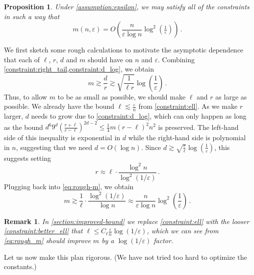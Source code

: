 \documentclass[10pt,a4paper]{article}
\newtheorem{proposition}{Proposition}[section]
\newtheorem{remark}{Remark}[section]
\renewcommand{\epsilon}{\varepsilon}
\begin{document}
\begin{proposition}
    \label{res:optimization}
    Under \cref{assumption:epsilon}, we may satisfy all of the
    constraints in such a way that
    \[
        m(n,\epsilon)
        = O\left( \frac{n}{\epsilon \log n} \log^2\left(\tfrac{1}{\epsilon}\right) \right) \,.
    \]
\end{proposition}

    We first sketch some rough calculations to motivate the asymptotic dependence that each of
    $\ell$, $r$, $d$ and $m$ should have on $n$ and $\epsilon$. Combining
    \cref{constraint:right_tail,constraint:d_log}, we obtain
    \begin{equation}
        \label{eq:rough-m}
        m \gtrsim \frac{d}{r} \gtrsim \sqrt{\frac{1}{\ell r}} \log\left(\frac{1}{\epsilon}\right)
        \,.
    \end{equation}
    Thus, to allow $m$ to be as small as possible, we should make $\ell$ and $r$ as large as
    possible. We already have the bound $\ell \lesssim \frac{\epsilon}{n}$ from
    \cref{constraint:ell}. As we make $r$ larger, $d$ needs to grow due to \cref{constraint:d_log},
    which can only happen as long as the bound
    $d^6 9^d \left(\frac{r+\ell}{r-\ell}\right)^{2d-2} \leq \tfrac{1}{4} m(r-\ell)^2 n^2$ is
    preserved. The left-hand side of this inequality is exponential in $d$ while
    the right-hand side is polynomial in $n$, suggesting that we need $d = O(\log n)$. Since $d
    \gtrsim \sqrt{\frac{r}{\ell}} \log\left(\frac{1}{\epsilon}\right)$, this suggests setting
    \[
        r \approx \ell \cdot \frac{\log^2 n}{\log^2(1/\epsilon)} \,.
    \]
    Plugging back into \eqref{eq:rough-m}, we obtain
    \begin{equation}
    \label{eq:rough_m}
        m \gtrsim \frac{1}{\ell} \cdot \frac{\log^2(1/\epsilon)}{\log n}
        \approx \frac{n}{\epsilon \log n} \log^2\left(\frac{1}{\epsilon}\right) \,.
    \end{equation}
    \begin{remark}
      In \cref{section:improved-bound} we replace \cref{constraint:ell} with the looser
      \cref{constraint:better_ell} that $\ell \leq C_\ell \tfrac{\epsilon}{n} \log(1/\epsilon)$, which we
      can see from \cref{eq:rough_m} should improve $m$ by a $\log(1/\epsilon)$ factor.
    \end{remark}
    Let us now make this plan rigorous. (We have not tried too hard to optimize the constants.)
\end{document}
